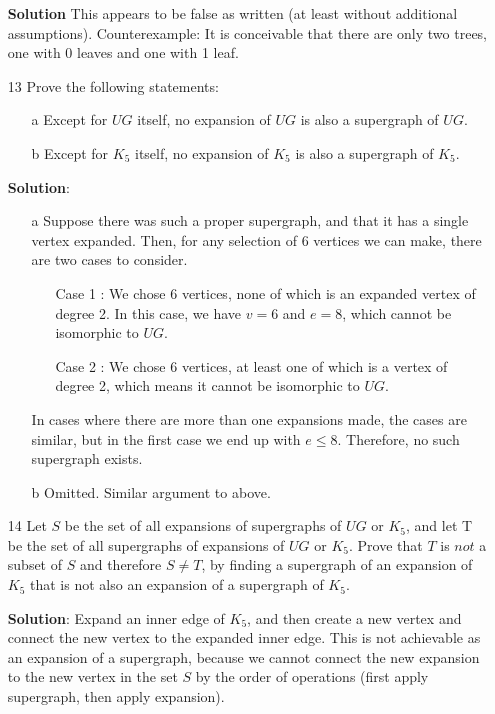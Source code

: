 \documentclass{article}
\begin{document}
\begin{enumerate}
	\textbf{Solution} This appears to be false as written (at least without additional assumptions). Counterexample: It is conceivable that there are only two trees, one with 0 leaves and one with 1 leaf.

	\item[13] Prove the following statements:
		\begin{enumerate}
			\item[a] Except for $UG$ itself, no expansion of $UG$ is also a supergraph of $UG$.
			\item[b] Except for $K_5$ itself, no expansion of $K_5$ is also a supergraph of $K_5$.
		\end{enumerate}

	\textbf{Solution}: 
		\begin{enumerate}
			\item[a] Suppose there was such a proper supergraph, and that it has a single vertex expanded. Then, for any selection of 6 vertices we can make, there are two cases to consider.
				\begin{enumerate}
					\item[Case 1]: We chose 6 vertices, none of which is an expanded vertex of degree 2. In this case, we have $v = 6$ and $e = 8$, which cannot be isomorphic to $UG$.
					\item[Case 2]: We chose 6 vertices, at least one of which is a vertex of degree 2, which means it cannot be isomorphic to $UG$.		
				\end{enumerate}
				In cases where there are more than one expansions made, the cases are similar, but in the first case we end up with $e \leq 8$.
				Therefore, no such supergraph exists.
			\item[b] Omitted. Similar argument to above.
		\end{enumerate}
	\item[14] Let $S$ be the set of all expansions of supergraphs of $UG$ or $K_5$, and let T be the set of all supergraphs of expansions of $UG$ or $K_5$. Prove that $T$ is $not$ a subset of $S$ and therefore $S \neq T$, by finding a supergraph of an expansion of $K_5$ that is not also an expansion of a supergraph of $K_5$.

	\textbf{Solution}: Expand an inner edge of $K_5$, and then create a new vertex and connect the new vertex to the expanded inner edge. This is not achievable as an expansion of a supergraph, because we cannot connect the new expansion to the new vertex in the set $S$ by the order of operations (first apply supergraph, then apply expansion).
	

\end{enumerate}
\end{document}
